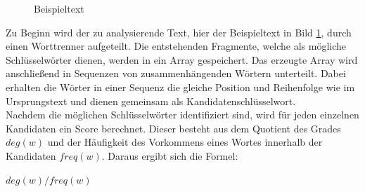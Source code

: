 			\begin{figure}[h!]
				\caption{Beispieltext \cite{schubert2011didaktik}}
				\label{fig:text}
			\end{figure}
			
			Zu Beginn wird der zu analysierende Text, hier der Beispieltext in Bild \ref{fig:text}, durch einen Worttrenner aufgeteilt. Die entstehenden Fragmente, welche als mögliche Schlüsselwörter dienen, werden in ein Array gespeichert. Das erzeugte Array wird anschließend in Sequenzen von zusammenhängenden Wörtern unterteilt. Dabei erhalten die Wörter in einer Sequenz die gleiche Position und Reihenfolge wie im Ursprungstext und dienen gemeinsam als Kandidatenschlüsselwort.\cite{rose2010automatic}\\	
			Nachdem die möglichen Schlüsselwörter identifiziert sind, wird für jeden einzelnen Kandidaten ein Score berechnet. Dieser besteht aus dem Quotient des Grades $deg(w)$ und der Häufigkeit des Vorkommens eines Wortes innerhalb der Kandidaten $freq(w)$. Daraus ergibt sich die Formel:
			\begin{center}
				$deg(w)/freq(w) $
			\end{center}	
			
